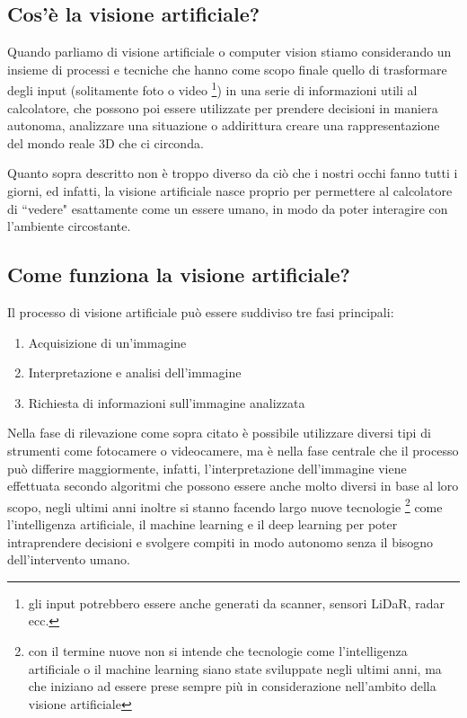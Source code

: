 \documentclass[12pt,a4paper,openright,twoside]{book}
\begin{document}
\subsection{Cos'è la visione artificiale?}
Quando parliamo di visione artificiale o computer vision stiamo considerando un insieme di processi e tecniche che hanno come scopo finale quello di trasformare degli input (solitamente foto o video \footnote{gli input potrebbero essere anche generati da scanner, sensori LiDaR, radar ecc.}) in una serie di informazioni utili al calcolatore, che possono poi essere utilizzate per prendere decisioni in maniera autonoma, analizzare una situazione o addirittura creare una rappresentazione del mondo reale 3D che ci circonda. \cite{bradski2008learning} \cite{microsoftArtificialVision}

Quanto sopra descritto non è troppo diverso da ciò che i nostri occhi fanno tutti i giorni, ed infatti, la visione artificiale nasce proprio per permettere al calcolatore di ``vedere" esattamente come un essere umano, in modo da poter interagire con l'ambiente circostante.

\subsection{Come funziona la visione artificiale?}
Il processo di visione artificiale può essere suddiviso tre fasi principali:
\begin{enumerate}
	\item Acquisizione di un'immagine
	\item Interpretazione e analisi dell'immagine
	\item Richiesta di informazioni sull'immagine analizzata
\end{enumerate}
Nella fase di rilevazione come sopra citato è possibile utilizzare diversi tipi di strumenti come fotocamere o videocamere, ma è nella fase centrale che il processo può differire maggiormente, infatti, l'interpretazione dell'immagine viene effettuata secondo algoritmi che possono essere anche molto diversi in base al loro scopo, negli ultimi anni inoltre si stanno facendo largo nuove tecnologie \footnote{con il termine nuove non si intende che tecnologie come l'intelligenza artificiale o il machine learning siano state sviluppate negli ultimi anni, ma che iniziano ad essere prese sempre più in considerazione nell'ambito della visione artificiale} come l'intelligenza artificiale, il machine learning e il deep learning per poter intraprendere decisioni e svolgere compiti in modo autonomo senza il bisogno dell'intervento umano.
\end{document}
